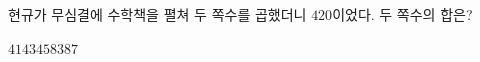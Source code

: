 현규가 무심결에 수학책을 펼쳐 두 쪽수를 곱했더니 $420$이었다. 두 쪽수의 합은?
\begin{choices32}{$41$}{$43$}{$45$}{$83$}{$87$}\end{choices32}
